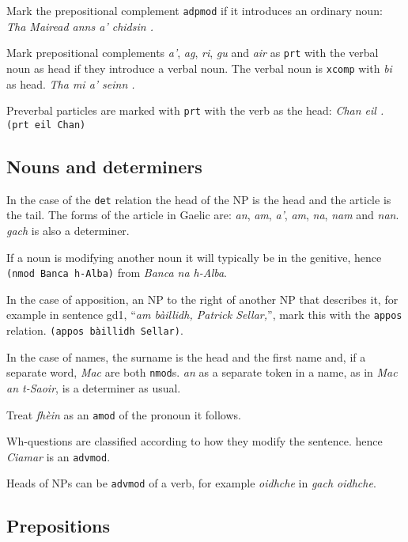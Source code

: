 \documentclass[a4paper]{article}
\begin{document}
 Mark the prepositional complement \texttt{adpmod} if it introduces an ordinary noun: \textit{Tha Mairead anns a' chidsin .}

 Mark prepositional complements \textit{a'}, \textit{ag}, \textit{ri}, \textit{gu} and \textit{air} as \texttt{prt} with the verbal noun as head if they introduce a verbal noun. The verbal noun is \texttt{xcomp} with \textit{bi} as head. \textit{Tha mi a' seinn .}

 Preverbal particles are marked with \texttt{prt} with the verb as the head: \textit{Chan eil .} \texttt{(prt eil Chan)} 

\subsection{Nouns and determiners}

 In the case of the \texttt{det} relation the head of the NP is the head and the article is the tail. The forms of the article in Gaelic are: \textit{an}, \textit{am}, \textit{a'}, \textit{am}, \textit{na}, \textit{nam} and \textit{nan}.
\textit{gach} is also a determiner.

 If a noun is modifying another noun it will typically be in the genitive, hence \texttt{(nmod Banca h-Alba)} from \textit{Banca na h-Alba}.

 In the case of apposition, an NP to the right of another NP that describes it, for example in sentence gd1, ``\textit{am b\`aillidh, Patrick Sellar,}'', mark this with the \texttt{appos} relation. \texttt{(appos b\`aillidh Sellar)}. 

 In the case of names, the surname is the head and the first name and, if a separate word, \textit{Mac} are both \texttt{nmod}s. \textit{an} as a separate token in a name, as in \textit{Mac an t-Saoir}, is a determiner as usual.

 Treat \textit{fh\`ein} as an \texttt{amod} of the pronoun it follows.

 Wh-questions are classified according to how they modify the sentence. hence \textit{Ciamar} is an \texttt{advmod}.

 Heads of NPs can be \texttt{advmod} of a verb, for example \textit{oidhche} in \textit{gach oidhche}.

\subsection{Prepositions}
\end{document}

